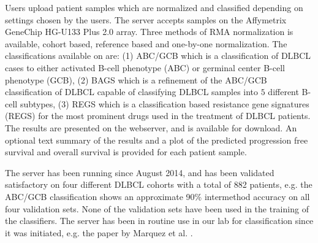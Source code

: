 Users upload patient samples which are normalized and classified depending on settings chosen by the users. The server accepts samples on the Affymetrix GeneChip HG-U133 Plus 2.0 array. Three  methods of RMA normalization is available, cohort based, reference based and one-by-one normalization. The classifications available on \hemaClass{} are:
(1) ABC/GCB \cite{Alizadeh2000} which is a classification of DLBCL cases to either activated B-cell phenotype (ABC) or germinal center B-cell phenotype (GCB),
(2) BAGS \cite{DybkaerBoegsted2015} which is a refinement of the ABC/GCB classification of DLBCL capable of classifying DLBCL samples into $5$ different B-cell subtypes,
(3) REGS \cite{Falgreen2015} which is a classification based resistance gene signatures (REGS) for the most prominent drugs used in the treatment of DLBCL patients.
The results are presented on the webserver, and is available for download. An optional text summary of the results and a plot of the predicted progression free survival and overall survival is provided for each patient sample.

The server has been running since August 2014, and has been validated satisfactory on four different DLBCL cohorts with a total of 882 patients, e.g. the ABC/GCB classification shows an approximate 90\% intermethod accuracy on all four validation sets. None of the validation sets have been used in the training of the classifiers. The server has been in routine use in our lab for classification since it was initiated, e.g. the paper by Marquez et al. \cite{Marquez2015}.


\begingroup
\renewcommand{\section}[2]{}%


\endgroup



